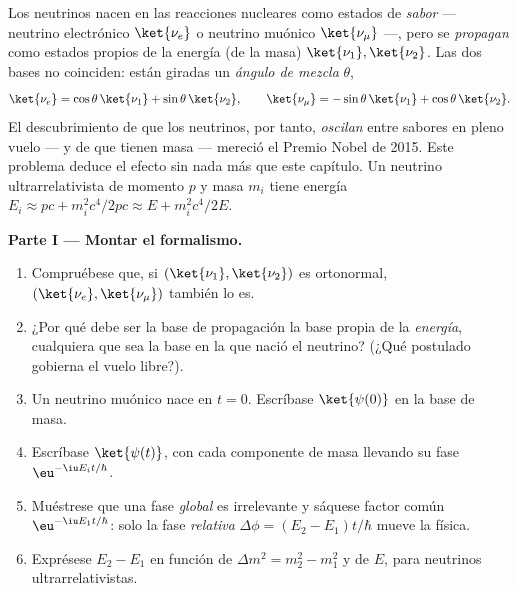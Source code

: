 \begin{problem}\label{pb:b3:quantum-formalism:1}
Los neutrinos nacen en las reacciones nucleares como estados de
\emph{sabor} --- neutrino electrónico $\ket{\nu_e}$ o neutrino muónico
$\ket{\nu_\mu}$ ---, pero se \emph{propagan} como estados propios de la
energía (de la masa) $\ket{\nu_1},
\ket{\nu_2}$. Las dos bases no coinciden: están giradas un \emph{ángulo de
mezcla} $\theta$,
\[
\ket{\nu_e} = \cos\theta\,\ket{\nu_1} + \sin\theta\,\ket{\nu_2} ,
\qquad
\ket{\nu_\mu} = -\sin\theta\,\ket{\nu_1} + \cos\theta\,\ket{\nu_2} .
\]
El descubrimiento de que los neutrinos, por tanto, \emph{oscilan} entre
sabores en pleno vuelo --- y de que tienen masa --- mereció el Premio Nobel
de 2015. Este problema deduce el efecto sin nada más que este
capítulo. Un neutrino ultrarrelativista de momento $p$ y masa
$m_i$ tiene energía $E_i \approx pc + m_i^2c^4/2pc \approx E +
m_i^2c^4/2E$.

\medskip\noindent\textbf{Parte I --- Montar el formalismo.}
\begin{enumerate}
  \item Compruébese que, si $(\ket{\nu_1}, \ket{\nu_2})$ es ortonormal,
        $(\ket{\nu_e}, \ket{\nu_\mu})$ también lo es.
  \item ¿Por qué debe ser la base de propagación la base propia de la
        \emph{energía}, cualquiera que sea la base en la que nació el
        neutrino? (¿Qué postulado gobierna el vuelo libre?).
  \item Un neutrino muónico nace en $t = 0$. Escríbase $\ket{\psi(0)}$ en
        la base de masa.
  \item Escríbase $\ket{\psi(t)}$, con cada componente de masa llevando su
        fase $\eu^{-\iu E_it/\hbar}$.
  \item Muéstrese que una fase \emph{global} es irrelevante y sáquese
        factor común $\eu^{-\iu E_1t/\hbar}$: solo la fase \emph{relativa}
        $\Delta\phi = (E_2 - E_1)t/\hbar$ mueve la física.
  \item Exprésese $E_2 - E_1$ en función de $\Delta m^2 = m_2^2 - m_1^2$
        y de $E$, para neutrinos ultrarrelativistas.
\end{enumerate}


\end{problem}
